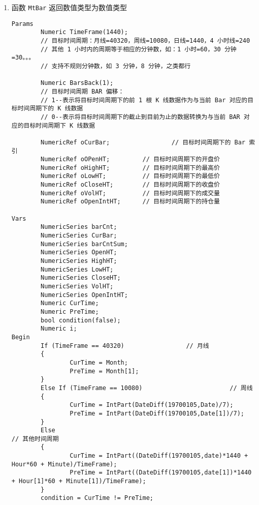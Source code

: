 \documentclass[11pt]{ctexart}
\begin{document}
\begin{enumerate}
\item 函数 \texttt{MtBar} 返回数值类型为数值类型

\begin{verbatim}
Params
        Numeric TimeFrame(1440);    
        // 目标时间周期：月线=40320，周线=10080，日线=1440，4 小时线=240
        // 其他 1 小时内的周期等于相应的分钟数，如：1 小时=60，30 分钟=30。。。
        // 支持不规则分钟数，如 3 分钟，8 分钟，之类都行

        Numeric BarsBack(1);
        // 目标时间周期 BAR 偏移：
        // 1--表示将目标时间周期下的前 1 根 K 线数据作为与当前 Bar 对应的目标时间周期下的 K 线数据
        // 0--表示将目标时间周期下的截止到目前为止的数据转换为与当前 BAR 对应的目标时间周期下 K 线数据

        NumericRef oCurBar;                 // 目标时间周期下的 Bar 索引
        NumericRef oOPenHT;         // 目标时间周期下的开盘价
        NumericRef oHighHT;         // 目标时间周期下的最高价
        NumericRef oLowHT;          // 目标时间周期下的最低价
        NumericRef oCloseHT;        // 目标时间周期下的收盘价
        NumericRef oVolHT;          // 目标时间周期下的成交量
        NumericRef oOpenIntHT;      // 目标时间周期下的持仓量

Vars
        NumericSeries barCnt;
        NumericSeries CurBar;
        NumericSeries barCntSum;
        NumericSeries OpenHT;
        NumericSeries HighHT;
        NumericSeries LowHT;
        NumericSeries CloseHT;
        NumericSeries VolHT;
        NumericSeries OpenIntHT;
        Numeric CurTime;
        Numeric PreTime;
        bool condition(false);
        Numeric i;
Begin
        If (TimeFrame == 40320)                 // 月线
        {
                CurTime = Month;
                PreTime = Month[1];
        }
        Else If (TimeFrame == 10080)                        // 周线
        {
                CurTime = IntPart(DateDiff(19700105,Date)/7);
                PreTime = IntPart(DateDiff(19700105,Date[1])/7);
        }
        Else                                                                        // 其他时间周期
        {
                CurTime = IntPart((DateDiff(19700105,date)*1440 + Hour*60 + Minute)/TimeFrame);
                PreTime = IntPart((DateDiff(19700105,date[1])*1440 + Hour[1]*60 + Minute[1])/TimeFrame);
        } 
        condition = CurTime != PreTime;


\end{verbatim}
\end{enumerate}
\end{document}
